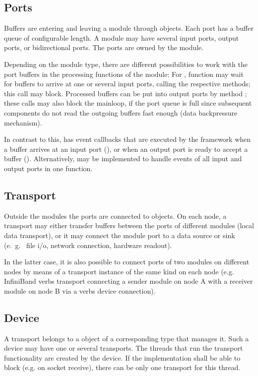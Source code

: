       
\subsection{Ports}
Buffers are entering and leaving a module through 
  objects. 
Each port has a buffer queue of configurable length.
A module may have several input ports, output ports, 
or bidirectional ports. The ports are owned by the module.

Depending on the module type, there are different possibilities to
work with the port buffers in the processing functions of the module: 
For     , function  may wait for buffers 
to arrive at one or several input ports, calling the respective  methods; this call may block. 
Processed buffers can be put into output ports by method ; 
these calls may also block the mainloop, if the port queue is full since
subsequent components do not read the outgoing buffers fast enough (data backpressure mechanism).

In contrast to this,    
has event callbacks that are executed 
by the framework when a buffer arrives at an input 
port (), or when an output 
port is ready to accept a buffer (). 
Alternatively,  may be implemented to handle events of all input and output ports
in one function. 



\subsection{Transport}
Outside the modules the ports are connected to 
  objects.
On each node, a transport may either transfer buffers between 
the ports of different modules (local data transport), or it may connect the module port to a data 
source or sink (e.~g.~ file i/o, network connection, hardware readout).

In the latter case, it is also possible  to connect ports of two modules on 
different nodes by means of a transport instance of the same kind on 
each node (e.g. InfiniBand verbs transport connecting a sender module on node A with a receiver
module on node B via a verbs device connection).

\subsection{Device}
A transport belongs to a  
 object of a 
corresponding type that manages it. Such a device may have one or several transports.  
The threads that run the transport functionality are
created by the device. If the  implementation 
shall be able to block (e.g. on socket receive), there can be only 
one transport for this thread. 

